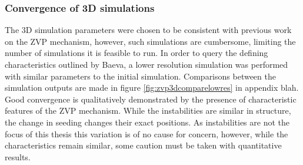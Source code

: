 \subsubsection{Convergence of 3D simulations}
The 3D simulation parameters were chosen to be consistent with previous work on the \ac{ZVP} mechanism, however, such simulations are cumbersome, limiting the number of simulations it is feasible to run. In order to query the defining characteristics outlined by Baeva, a lower resolution simulation was performed with similar parameters to the initial simulation. Comparisons between the simulation outputs are made in figure \ref{fig:zvp3dcomparelowres} in appendix blah. Good convergence is qualitatively demonstrated by the presence of characteristic features of the ZVP mechanism. While the instabilities are similar in structure, the change in seeding changes their exact positions. As instabilities are not the focus of this thesis this variation is of no cause for concern, however, while the characteristics remain similar, some caution must be taken with quantitative results.

